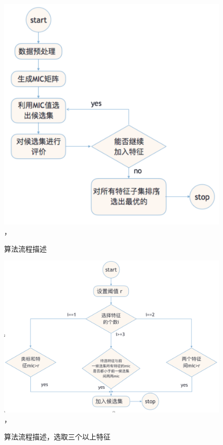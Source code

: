 \documentclass{njubachelor}
\begin{document}
\begin{figure}[!ht]
  \centering
  \includegraphics[width=5.5in]{pic/fig5}， 
  \caption{算法流程描述}
\end{figure}

\begin{figure}[!ht]
  \centering
  \includegraphics[width=5.5in]{pic/fig6}， 
  \caption{算法流程描述，选取三个以上特征}
\end{figure}
\end{document}
